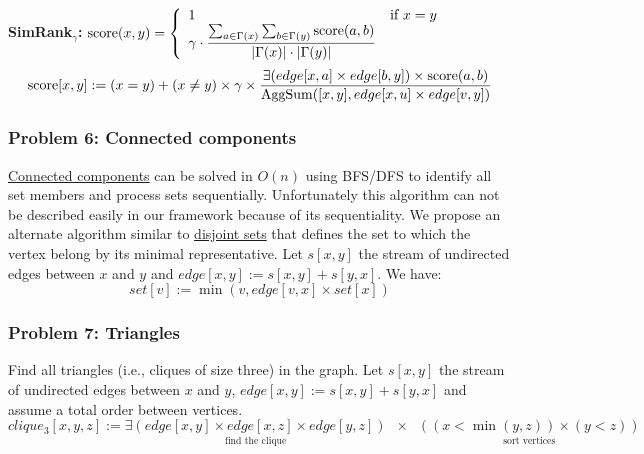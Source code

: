 \documentclass[11pt]{article}
\begin{document}
{\bf SimRank${}_\gamma$:} ${\rm score}(x,y)=\left\{\begin{array}{ll}1&\text{if }x=y\\
	\gamma\cdot\dfrac{\sum_{a\in\Gamma(x)}\sum_{b\in\Gamma(y)} {\rm score}(a,b)}
		{|\Gamma(x)| \cdot |\Gamma(y)|} \end{array}\right.$
\[{\rm score}[x,y] := (x=y) + (x\ne y) \times\gamma\times\dfrac
	{\exists(edge[x,a] \times edge[b,y]) \times {\rm score}(a,b)}
	{{\rm AggSum}([x,y], edge[x,u] \times edge[v,y])}\]

\subsubsection*{Problem 6: Connected components}
\href{http://en.wikipedia.org/wiki/Connected_component_(graph_theory)}{Connected components} can be solved in $O(n)$ using BFS/DFS to identify all set members and process sets sequentially. Unfortunately this algorithm can not be described easily in our framework because of its sequentiality. We propose an alternate algorithm similar to \href{http://en.wikipedia.org/wiki/Disjoint-set_data_structure}{disjoint sets} that defines the set to which the vertex belong by its minimal representative. Let $s[x,y]$ the stream of undirected edges between $x$ and $y$ and $edge[x,y] := s[x,y]+s[y,x]$. We have:
\[set[v] := \min(v, edge[v,x] \times set[x])\]

\subsubsection*{Problem 7: Triangles}
Find all triangles (i.e., cliques of size three) in the graph. Let $s[x,y]$ the stream of undirected edges between $x$ and $y$, $edge[x,y] := s[x,y]+s[y,x]$ and assume a total order between vertices.
\[clique_3[x,y,z] := \underset{\text{find the clique}}{\exists(edge[x,y] \times edge[x,z] \times edge[y,z])}
	\;\;\times\;\; \underset{\text{sort vertices}}{((x< \min(y,z)) \times (y < z))}\]

\end{document}
